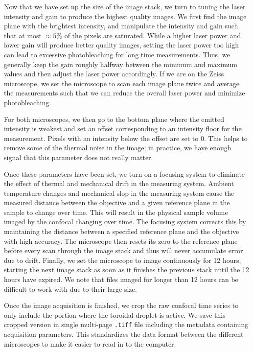 Now that we have set up the size of the image stack, we turn to tuning the laser intensity and gain to produce the highest quality images.
We first find the image plane with the brightest intensity, and manipulate the intensity and gain such that at most $\approx 5$\%  of the pixels are saturated.
While a higher laser power and lower gain will produce better quality images, setting the laser power too high can lead to excessive photobleaching for long time measurements.
Thus, we generally keep the gain roughly halfway between the minimum and maximum values and then adjust the laser power accordingly.
If we are on the Zeiss microscope, we set the microscope to scan each image plane twice and average the measurements such that we can reduce the overall laser power and minimize photobleaching.

For both microscopes, we then go to the bottom plane where the emitted intensity is weakest and set an offset corresponding to an intensity floor for the measurement.
Pixels with an intensity below the offset are set to 0.
This helps to remove some of the thermal noise in the image; in practice, we have enough signal that this parameter does not really matter.

Once these parameters have been set, we turn on a focusing system to eliminate the effect of thermal and mechanical drift in the measuring system.
Ambient temperature changes and mechanical slop in the measuring system cause the measured distance between the objective and a given reference plane in the sample to change over time.
This will result in the physical sample volume imaged by the confocal changing over time.
The focusing system corrects this by maintaining the distance between a specified reference plane and the objective with high accuracy.
The microscope then resets its zero to the reference plane before every scan through the image stack and thus will never accumulate error due to drift.
Finally, we set the microscope to image continuously for 12 hours, starting the next image stack as soon as it finishes the previous stack until the 12 hours have expired.
We note that files imaged for longer than 12 hours can be difficult to work with due to their large size.

Once the image acquisition is finished, we crop the raw confocal time series to only include the portion where the toroidal droplet is active.
We save this cropped version in single multi-page \texttt{.tiff} file including the metadata containing acquisition parameters.
This standardizes the data format between the different microscopes to make it easier to read in to the computer.



